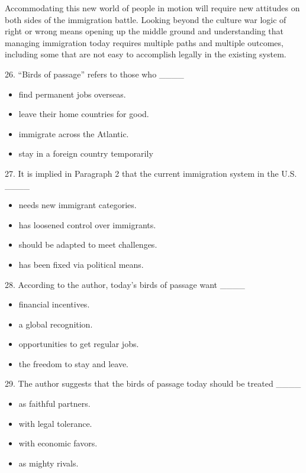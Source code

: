 \documentclass[UTF8,11pt]{ctexart}
\begin{document}
Accommodating this new world of people in motion will require new attitudes on both sides of the immigration battle. Looking beyond the culture war logic of right or wrong means opening up the middle ground and understanding that managing immigration today requires multiple paths and multiple outcomes, including some that are not easy to accomplish legally in the existing system.


26. “Birds of passage” refers to those who \_\_\_\_


\begin{itemize}[leftmargin=2em,itemsep=.2em,topsep=.4em]\item[A.] find permanent jobs overseas.
\item[B.] leave their home countries for good.
\item[C.] immigrate across the Atlantic.
\item[D.] stay in a foreign country temporarily
\end{itemize}

27. It is implied in Paragraph 2 that the current immigration system in the U.S. \_\_\_\_


\begin{itemize}[leftmargin=2em,itemsep=.2em,topsep=.4em]\item[A.] needs new immigrant categories.
\item[B.] has loosened control over immigrants.
\item[C.] should be adapted to meet challenges.
\item[D.] has been fixed via political means.
\end{itemize}

28. According to the author, today’s birds of passage want \_\_\_\_


\begin{itemize}[leftmargin=2em,itemsep=.2em,topsep=.4em]\item[A.] financial incentives.
\item[B.] a global recognition.
\item[C.] opportunities to get regular jobs.
\item[D.] the freedom to stay and leave.
\end{itemize}

29. The author suggests that the birds of passage today should be treated \_\_\_\_


\begin{itemize}[leftmargin=2em,itemsep=.2em,topsep=.4em]\item[A.] as faithful partners.
\item[B.] with legal tolerance.
\item[C.] with economic favors.
\item[D.] as mighty rivals.
\end{itemize}
\end{document}
